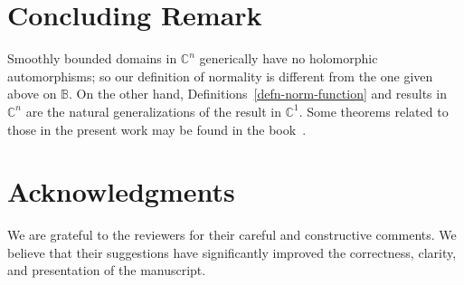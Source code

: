 \documentclass[pdflatex]{sn-jnl}%
\theoremstyle{definition}
\theoremstyle{remark}
\numberwithin{equation}{section}
\newcommand{\C}{\mathbb{C}}
\begin{document}
    \section{Concluding Remark}

    Smoothly bounded domains in $\C^n$ generically have no holomorphic automorphisms; so our definition of normality is different from the one given above on $\mathbb{B}$.
    On the other hand, Definitions~\ref{defn-norm-function} and results in $\C^n$ are the natural generalizations of the result in $\C^1$.
    Some theorems related to those in the present work may be found in the book~\cite{MR4935535}.

    \section{Acknowledgments}

    We are grateful to the reviewers for their careful and constructive comments.
    We believe that their suggestions have significantly improved the correctness, clarity, and presentation of the manuscript.

    
\end{document}
